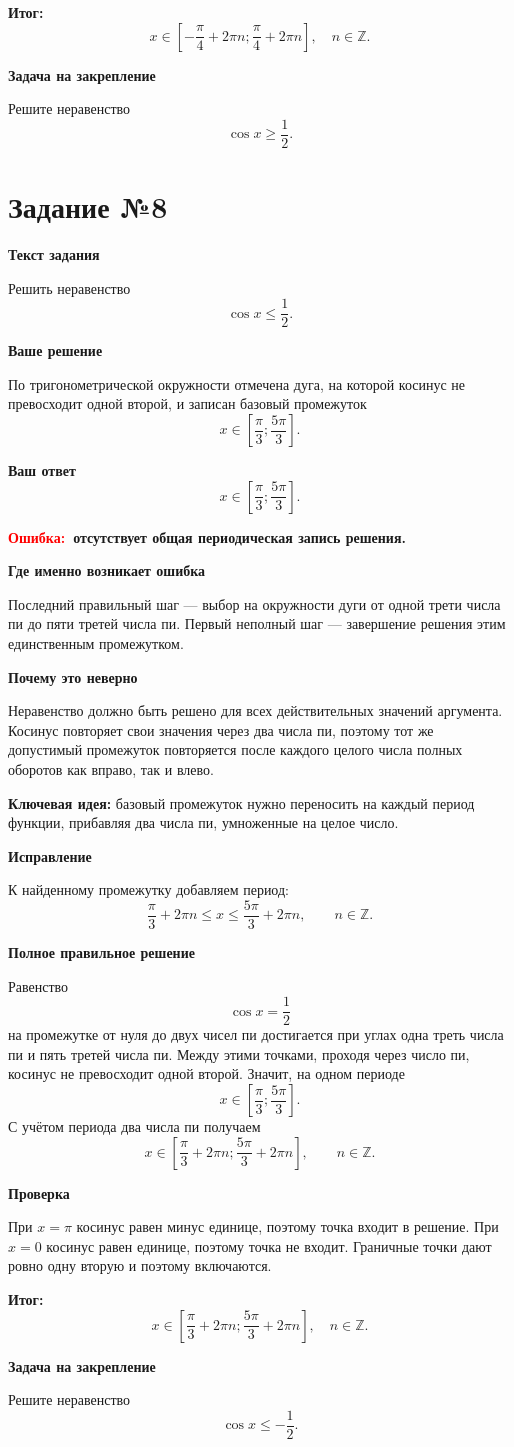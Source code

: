 \documentclass[12pt,a4paper]{article}
\newcommand{\err}{\textcolor{red}{Ошибка:}}
\newcommand{\idea}{\textcolor{blue!60!black}{Ключевая идея:}}
\newcommand{\result}{\textcolor{teal!60!black}{Итог:}}
\begin{document}
\textbf{\result}
\[
\boxed{x\in\left[-\frac\pi4+2\pi n;\frac\pi4+2\pi n\right],\quad n\in\mathbb Z.}
\]

\textbf{Задача на закрепление}

Решите неравенство
\[
\cos x\ge \frac12.
\]

\newpage
{}\label{task:8}
\section*{Задание №8}
\textbf{Текст задания}

Решить неравенство
\[
\cos x\le \frac12.
\]

\textbf{Ваше решение}

По тригонометрической окружности отмечена дуга, на которой косинус не превосходит одной второй, и записан базовый промежуток
\[
x\in\left[\frac\pi3;\frac{5\pi}3\right].
\]

\textbf{Ваш ответ}
\[
x\in\left[\frac\pi3;\frac{5\pi}3\right].
\]

\textbf{\err\ отсутствует общая периодическая запись решения.}

\textbf{Где именно возникает ошибка}

Последний правильный шаг --- выбор на окружности дуги от одной трети числа пи до пяти третей числа пи. Первый неполный шаг --- завершение решения этим единственным промежутком.

\textbf{Почему это неверно}

Неравенство должно быть решено для всех действительных значений аргумента. Косинус повторяет свои значения через два числа пи, поэтому тот же допустимый промежуток повторяется после каждого целого числа полных оборотов как вправо, так и влево.

\textbf{\idea} базовый промежуток нужно переносить на каждый период функции, прибавляя два числа пи, умноженные на целое число.

\textbf{Исправление}

К найденному промежутку добавляем период:
\[
\frac\pi3+2\pi n\le x\le \frac{5\pi}3+2\pi n,
\qquad n\in\mathbb Z.
\]

\textbf{Полное правильное решение}

Равенство
\[
\cos x=\frac12
\]
на промежутке от нуля до двух чисел пи достигается при углах одна треть числа пи и пять третей числа пи. Между этими точками, проходя через число пи, косинус не превосходит одной второй. Значит, на одном периоде
\[
x\in\left[\frac\pi3;\frac{5\pi}3\right].
\]
С учётом периода два числа пи получаем
\[
x\in\left[\frac\pi3+2\pi n;\frac{5\pi}3+2\pi n\right],
\qquad n\in\mathbb Z.
\]

\textbf{Проверка}

При $x=\pi$ косинус равен минус единице, поэтому точка входит в решение. При $x=0$ косинус равен единице, поэтому точка не входит. Граничные точки дают ровно одну вторую и поэтому включаются.

\textbf{\result}
\[
\boxed{x\in\left[\frac\pi3+2\pi n;\frac{5\pi}3+2\pi n\right],\quad n\in\mathbb Z.}
\]

\textbf{Задача на закрепление}

Решите неравенство
\[
\cos x\le -\frac12.
\]
\end{document}
